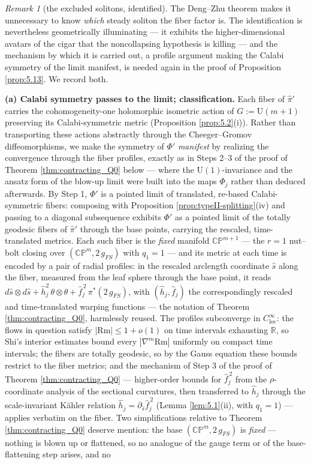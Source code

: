 \documentclass[11pt]{amsart}
\theoremstyle{plain}
\numberwithin{equation}{section}
\theoremstyle{definition}
\theoremstyle{remark}
\newtheorem*{remarkx}{Remark}
\begin{document}
\begin{remarkx}[the excluded solitons, identified]
	The Deng--Zhu theorem makes it unnecessary to know \emph{which} steady soliton the fiber factor is. The identification is nevertheless geometrically illuminating --- it exhibits the higher-dimensional avatars of the cigar that the noncollapsing hypothesis is killing --- and the mechanism by which it is carried out, a profile argument making the Calabi symmetry of the limit manifest, is needed again in the proof of Proposition \ref{prop:5.13}. We record both.
	
	\textbf{(a) Calabi symmetry passes to the limit; classification.} Each fiber of $\widehat{\pi}'$ carries the cohomogeneity-one holomorphic isometric action of $G := \mathrm{U} ( m + 1 )$ preserving its Calabi-symmetric metric (Proposition \ref{prop:5.2}(i)). Rather than transporting these actions abstractly through the Cheeger--Gromov diffeomorphisms, we make the symmetry of $\Phi'$ \emph{manifest} by realizing the convergence through the fiber profiles, exactly as in Steps 2--3 of the proof of Theorem \ref{thm:contracting_Q0} below --- where the $\mathrm{U} (1)$-invariance and the ansatz form of the blow-up limit were built into the maps $\Phi_j$ rather than deduced afterwards. By Step 1, $\Phi'$ is a pointed limit of translated, re-based Calabi-symmetric fibers: composing with Proposition \ref{prop:typeII-splitting}(iv) and passing to a diagonal subsequence exhibits $\Phi'$ as a pointed limit of the totally geodesic fibers of $\widehat{\pi}'$ through the base points, carrying the rescaled, time-translated metrics. Each such fiber is the \emph{fixed} manifold $\mathbb{CP}^{m+1}$ --- the $r = 1$ nut--bolt closing over $( \mathbb{CP}^m, 2\, g_{FS} )$ with $q_1 = 1$ --- and its metric at each time is encoded by a pair of radial profiles: in the rescaled arclength coordinate $\hat{s}$ along the fiber, measured from the leaf sphere through the base point, it reads $d\hat{s} \otimes d\hat{s} + \hat{h}_j^2\, \theta \otimes \theta + \hat{f}_j^{\,2}\, \pi^* ( 2\, g_{FS} )$, with $( \hat{h}_j, \hat{f}_j )$ the correspondingly rescaled and time-translated warping functions --- the notation of Theorem \ref{thm:contracting_Q0}, harmlessly reused. The profiles subconverge in $C^\infty_{\mathrm{loc}}$: the flows in question satisfy $| \mathrm{Rm} | \leq 1 + o (1)$ on time intervals exhausting $\mathbb{R}$, so Shi's interior estimates \cite{Shi} bound every $| \nabla^m \mathrm{Rm} |$ uniformly on compact time intervals; the fibers are totally geodesic, so by the Gauss equation these bounds restrict to the fiber metrics; and the mechanism of Step 3 of the proof of Theorem \ref{thm:contracting_Q0} --- higher-order bounds for $\hat{f}_j^{\,2}$ from the $\rho$-coordinate analysis of the sectional curvatures, then transferred to $\hat{h}_j$ through the scale-invariant Kähler relation $\hat{h}_j = \partial_{\hat{s}} \hat{f}_j^{\,2}$ (Lemma \ref{lem:5.1}(ii), with $q_1 = 1$) --- applies verbatim on the fiber. Two simplifications relative to Theorem \ref{thm:contracting_Q0} deserve mention: the base $( \mathbb{CP}^m, 2\, g_{FS} )$ is \emph{fixed} --- nothing is blown up or flattened, so no analogue of the gauge term or of the base-flattening step arises, and no 
\end{remarkx}
\end{document}
